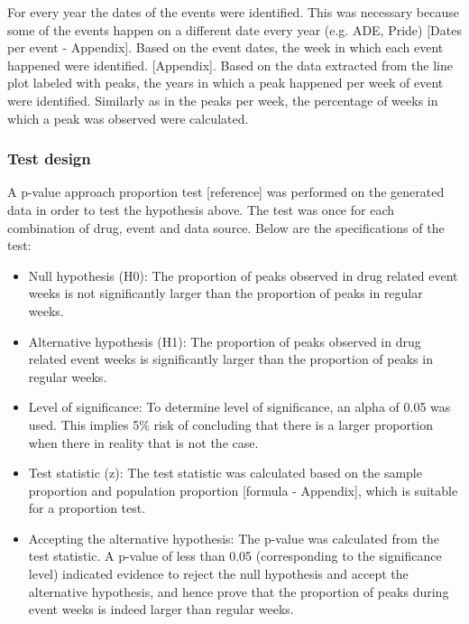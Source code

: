 For every year the dates of the events were identified. This was necessary because some of the events happen on a different date every year (e.g. ADE, Pride) [Dates per event - Appendix]. Based on the event dates, the week in which each event happened were identified. [Appendix]. Based on the data extracted from the line plot labeled with peaks, the years in which a peak happened per week of event were identified. Similarly as in the peaks per week, the percentage of weeks in which a peak was observed were calculated.

\subsubsection{Test design}

A p-value approach proportion test [reference] was performed on the generated data in order to test the hypothesis above. The test was once for each combination of drug, event and data source. Below are the specifications of the test:

\begin{itemize}
  \item Null hypothesis (H0): The proportion of peaks observed in drug related event weeks is not significantly larger than the proportion of peaks in regular weeks.
  \item Alternative hypothesis (H1): The proportion of peaks observed in drug related event weeks is significantly larger than the proportion of peaks in regular weeks.
  \item Level of significance: To determine level of significance, an alpha of 0.05 was used. This implies 5\% risk of concluding that there is a larger proportion when there in reality that is not the case.
  \item Test statistic (z): The test statistic was calculated based on the sample proportion and population proportion  [formula - Appendix], which is suitable for a proportion test. 
  \item Accepting the alternative hypothesis: The p-value was calculated from the test statistic. A p-value of less than 0.05 (corresponding to the significance level) indicated evidence to reject the null hypothesis and accept the alternative hypothesis, and hence prove that the proportion of peaks during event weeks is indeed larger than regular weeks.

\end{itemize}